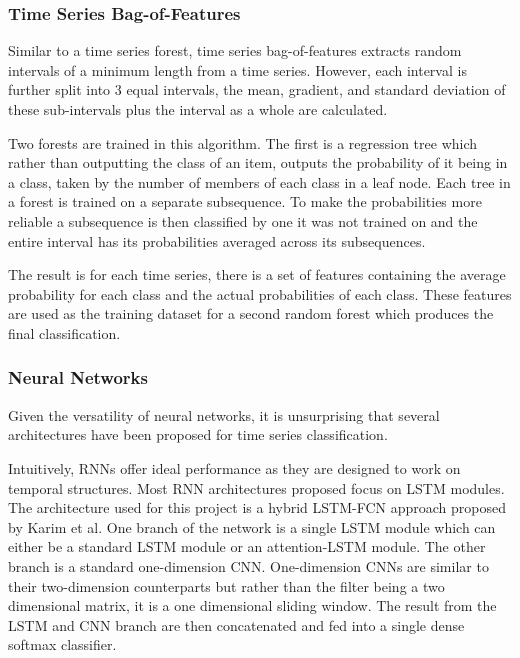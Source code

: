 \subsubsection{Time Series Bag-of-Features}

Similar to a time series forest, time series bag-of-features\cite{baydogan2013bag} extracts random intervals of a minimum length from a time series. However, each interval is further split into 3 equal intervals, the mean, gradient, and standard deviation of these sub-intervals plus the interval as a whole are calculated.

Two forests are trained in this algorithm. The first is a regression tree which rather than outputting the class of an item, outputs the probability of it being in a class, taken by the number of members of each class in a leaf node. Each tree in a forest is trained on a separate subsequence. To make the probabilities more reliable a subsequence is then classified by one it was not trained on and the entire interval has its probabilities averaged across its subsequences. 

The result is for each time series, there is a set of features containing the average probability for each class and the actual probabilities of each class. These features are used as the training dataset for a second random forest which produces the final classification. 

\subsubsection{Neural Networks}
\label{sec:ts-nns}

Given the versatility of neural networks, it is unsurprising that several architectures have been proposed for time series classification. 

Intuitively, RNNs offer ideal performance as they are designed to work on temporal structures. Most RNN architectures proposed focus on LSTM modules\cite{karim2017lstm}. The architecture used for this project is a hybrid LSTM-FCN approach proposed by Karim et al\cite{karim2017lstm}. One branch of the network is a single LSTM module which can either be a standard LSTM module or an attention-LSTM module. The other branch is a standard one-dimension CNN. One-dimension CNNs are similar to their two-dimension counterparts but rather than the filter being a two dimensional matrix, it is a one dimensional sliding window. The result from the LSTM and CNN branch are then concatenated and fed into a single dense softmax classifier.

